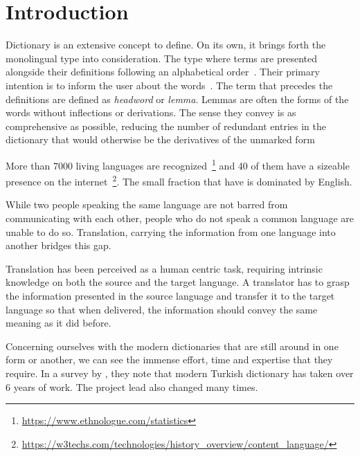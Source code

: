 \chapter{Introduction}\label{chap:introduction}%


Dictionary is an extensive concept to define.
On its own, it brings forth the monolingual type into consideration.
The type where terms are presented alongside their definitions following an alphabetical order~\cite{sterkenburg_practical_2003}.
Their primary intention is to inform the user about the words~\cite{uzun_modern_2005}.
The term that precedes the definitions are defined as \emph{headword} or \emph{lemma}.
Lemmas are often the forms of the words without inflections or derivations.
The sense they convey is as comprehensive as possible, reducing the number of redundant entries in the dictionary that would otherwise be the derivatives of the unmarked form~\cite{ibrahim_usta_turkce_2006}


More than 7000 living languages are recognized~\footnote{\url{https://www.ethnologue.com/statistics}} and 40 of them have a sizeable presence on the internet~\footnote{\url{https://w3techs.com/technologies/history_overview/content_language/}}.
The small fraction that have is dominated by English.

While two people speaking the same language are not barred from communicating with each other, people who do not speak a common language are unable to do so.
Translation, carrying the information from one language into another bridges this gap.

Translation has been perceived as a human centric task, requiring intrinsic knowledge on both the source and the target language.
A translator has to grasp the information presented in the source language and transfer it to the target language so that when delivered, the information should convey the same meaning as it did before.

Concerning ourselves with the modern dictionaries that are still around in one form or another, we can see the immense effort, time and expertise that they require.
In a survey by \textcite{uzun_1945ten_1999}, they note that modern Turkish dictionary has taken over 6 years of work.
The project lead also changed many times.

